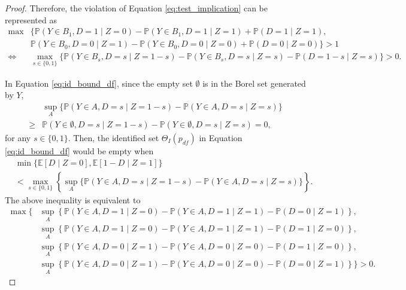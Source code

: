 \documentclass[12pt]{article}
\theoremstyle{plain}
\theoremstyle{definition}
\theoremstyle{remark}
\begin{document}
\begin{proof}
Therefore, the violation of Equation \eqref{eq:test_implication} can be represented as 
\begin{equation} \label{eq:cond1}
    \begin{aligned}
        \max& \big\{ \mathbb{P}\left(Y \in B_1, D = 1 \mid Z = 0\right) - \mathbb{P}\left(Y \in B_1, D = 1 \mid Z = 1\right) + \mathbb{P}\left(D = 1 \mid Z = 1\right) , \\
        & \mathbb{P}\left(Y \in B_0, D = 0 \mid Z = 1\right) - \mathbb{P}\left(Y \in B_0, D = 0 \mid Z = 0\right) + \mathbb{P}\left(D = 0 \mid Z = 0\right) \big\} > 1 \\
        \Longleftrightarrow & \max _{s \in \{0, 1\}} \Big\{\mathbb{P} \left(Y \in B_s, D = s \mid Z = 1-s\right) - \mathbb{P}\left(Y \in B_s, D = s \mid Z = s\right) - \mathbb{P}\left(D = 1-s \mid Z = s\right)\Big\} > 0.
    \end{aligned}
\end{equation}

In Equation \eqref{eq:id_bound_df}, since the empty set $\emptyset$ is in the Borel set generated by $Y$,
\begin{equation*}
    \begin{aligned}
        &\sup _A\{\mathbb{P}(Y \in A, D=s \mid Z=1-s)-\mathbb{P}(Y \in A, D=s \mid Z=s)\} \\
        \geq& \mathbb{P}(Y \in \emptyset, D=s \mid Z=1-s)-\mathbb{P}(Y \in \emptyset, D=s \mid Z=s) = 0,
    \end{aligned}
\end{equation*}
for any $s \in \{0,1\}$. Then, the identified set $\Theta_I(p_{df})$ in Equation \eqref{eq:id_bound_df} would be empty when 
\begin{equation*}
    \begin{aligned}
        &\min \{\mathbb{E}[D \mid Z=0], \mathbb{E}[1-D \mid Z=1]\} \\
        &< \max _{s \in\{0,1\}}\left\{\sup _A\{\mathbb{P}(Y \in A, D=s \mid Z=1-s)-\mathbb{P}(Y \in A, D=s \mid Z=s)\}\right\}.
    \end{aligned}
\end{equation*}
The above inequality is equivalent to 
\begin{equation} \label{eq:cond2}
    \begin{aligned}
        \max \Big\{&\sup_A \left\{\mathbb{P}\left(Y \in A, D = 1 \mid Z = 0\right) - \mathbb{P}\left(Y \in A, D = 1 \mid Z = 1\right) - \mathbb{P}\left(D = 0 \mid Z = 1\right)\right\}, \\
        &\sup_A \left\{\mathbb{P}\left(Y \in A, D = 1 \mid Z = 0\right) - \mathbb{P}\left(Y \in A, D = 1 \mid Z = 1\right) - \mathbb{P}\left(D = 1 \mid Z = 0\right)\right\}, \\
        &\sup_A \left\{\mathbb{P}\left(Y \in A, D = 0 \mid Z = 1\right) - \mathbb{P}\left(Y \in A, D = 0 \mid Z = 0\right) - \mathbb{P}\left(D = 1 \mid Z = 0\right)\right\}, \\
        &\sup_A \left\{\mathbb{P}\left(Y \in A, D = 0 \mid Z = 1\right) - \mathbb{P}\left(Y \in A, D = 0 \mid Z = 0\right) - \mathbb{P}\left(D = 0 \mid Z = 1\right)\right\} \Big\} >0.
    \end{aligned}
\end{equation}


\end{proof}
\end{document}
